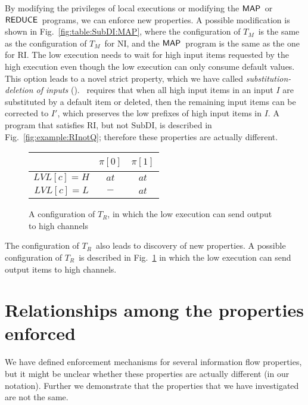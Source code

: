 \documentclass[10pt,a4paper,oneside]{article}
\def\LVL{\ensuremath{LVL}}
\def\TAV{\ensuremath{T_{M}}}
\def\TPV{\ensuremath{T_{R}}}
\def\chnl{\ensuremath{c}}
\def\sanserif#1{\ensuremath{\sf #1}}
\def\REDUCE{\ensuremath{\sanserif{REDUCE}}}
\def\MAP{\ensuremath{\sanserif{MAP}}}
\def\Prog{\ensuremath{\pi}}
\def\Progl#1{\ensuremath{\Prog[#1]}}
\def\prop1{\text{SubDI}}
\def\tnoaction{\ensuremath{-}}
\def\ttellput{\ensuremath{at}}
\def\tindex#1{\ensuremath{\Progl{#1}}}
\begin{document}
By modifying the privileges of local executions or modifying the \MAP\ or \REDUCE\ programs, we can enforce new properties. A possible modification is shown in Fig.~\ref{fig:table:SubDI:MAP}, where the configuration of \TAV\ is the same as the configuration of \TAV\ for NI, and the \MAP\ program is the same as the one for RI. The low execution needs to wait for high input items requested by the high execution even though the low execution can only consume default values. This option leads to a novel strict property, which we have called \emph{substitution-deletion of inputs} (\prop1). \prop1\ requires that when all high input items in an input $I$ are substituted by a default item or deleted, then the remaining input items can be corrected to $I'$, which preserves the low prefixes of high input items in $I$. A program that satisfies RI, but not $\prop1$, is described in Fig.~\ref{fig:example:RInotQ}; therefore these properties are actually different.

\begin{figure}
\centering
\begin{tabular}{|c|c|c|}
\hline
~ &  \tindex{0} & \tindex{1} \\
\hline
$\LVL[\chnl] = H$ & \ttellput & \ttellput \\
\hline
$\LVL[\chnl] = L$ & \tnoaction & \ttellput \\
\hline
\end{tabular}
\caption{A configuration of \TPV, in which the low execution can send output to high channels}
\label{fig:table:NI:nowaitoption}
\end{figure}



The configuration of \TPV\ also leads to discovery of new properties. A possible configuration of \TPV\ is described in Fig.~\ref{fig:table:NI:nowaitoption} in which the low execution can send output items to high channels.

\section{Relationships among the properties enforced}\label{sec:discussion:relationship}
We have defined enforcement mechanisms for several information flow properties, but it might be unclear whether these properties are actually different (in our notation). Further we demonstrate that the properties that we have investigated are not the same.
\end{document}
